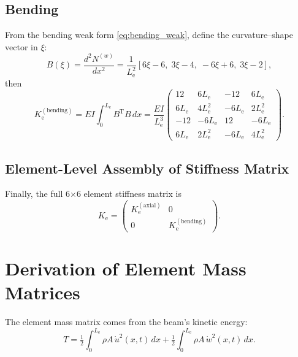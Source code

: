 \documentclass{article}
\begin{document}
	\subsection{Bending}
	From the bending weak form \eqref{eq:bending_weak}, define the curvature–shape vector in \(\xi\):
	\begin{equation}\label{eq:B_vector}
		B(\xi)
		= \frac{d^2N^{(w)}}{dx^2}
		= \frac{1}{L_\mathrm{e}^2}[6\xi-6,\;3\xi-4,\;-6\xi+6,\;3\xi-2],
	\end{equation}
	then
	\begin{equation}\label{eq:ke_bending}
		K_\mathrm{e}^{(\mathrm{bending})}
		= EI\int_0^{L_\mathrm{e}}B^\text{T} B\,dx
		= \frac{EI}{L_\mathrm{e}^3}
		\begin{pmatrix}
			12 & 6L_\mathrm{e} & -12 & 6L_\mathrm{e}\\
			6L_\mathrm{e} & 4L_\mathrm{e}^2 & -6L_\mathrm{e} & 2L_\mathrm{e}^2\\
			-12 & -6L_\mathrm{e} & 12 & -6L_\mathrm{e}\\
			6L_\mathrm{e} & 2L_\mathrm{e}^2 & -6L_\mathrm{e} & 4L_\mathrm{e}^2
		\end{pmatrix}.
	\end{equation}
	
	\subsection{Element-Level Assembly of Stiffness Matrix}
	Finally, the full 6×6 element stiffness matrix is
	\begin{equation}\label{eq:ke_assembled}
		K_\mathrm{e}
		= \begin{pmatrix}
			K_\mathrm{e}^{(\mathrm{axial})} & {0}\\
			{0}            & K_\mathrm{e}^{(\mathrm{bending})}
		\end{pmatrix}.
	\end{equation}
	
	\section{Derivation of Element Mass Matrices}
	The element mass matrix comes from the beam’s kinetic energy:
	\begin{equation}
		T
		= \tfrac12\int_0^{L_\mathrm{e}}\rho A\,\dot u^2(x,t)\,dx
		+\tfrac12\int_0^{L_\mathrm{e}}\rho A\,\dot w^2(x,t)\,dx.
	\end{equation}
	
\end{document}
